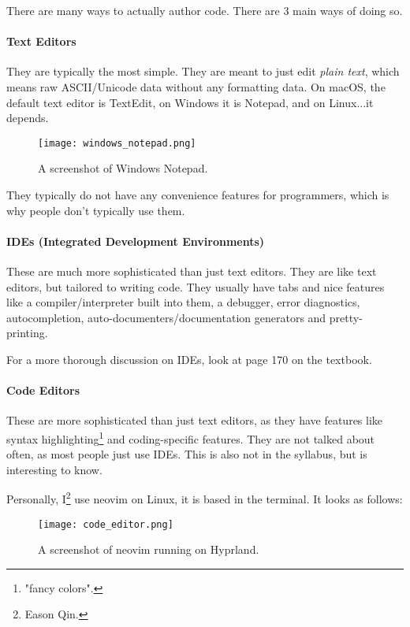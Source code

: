 \documentclass[../main.tex]{subfiles}
\begin{document}
There are many ways to actually author code. There are 3 main ways of doing so.

\paragraph{Text Editors}

They are typically the most simple. They are meant to just edit \emph{plain text}, which means raw ASCII/Unicode data without any formatting data. On macOS, the default text editor is TextEdit, on Windows it is Notepad, and on Linux...it depends.

\begin{figure}[H]
    \centering
    \texttt{[image: windows\_notepad.png]}
    \caption{A screenshot of Windows Notepad.}
    \label{fig:windows_notepad}
\end{figure}

They typically do not have any convenience features for programmers, which is why people don't typically use them.

\paragraph{IDEs (Integrated Development Environments)}

These are much more sophisticated than just text editors. They are like text editors, but tailored to writing code. They usually have tabs and nice features like a compiler/interpreter built into them, a debugger, error diagnostics, autocompletion, auto-documenters/documentation generators and pretty-printing.

For a more thorough discussion on IDEs, look at page 170 on the textbook.

\paragraph{Code Editors}

These are more sophisticated than just text editors, as they have features like syntax highlighting\footnote{"fancy colors".} and coding-specific features. They are not talked about often, as most people just use IDEs. This is also not in the syllabus, but is interesting to know.

Personally, I\footnote{Eason Qin.} use {\mono neovim} on Linux, it is based in the terminal. It looks as follows:

\begin{figure}[H]
    \centering
    \texttt{[image: code\_editor.png]}
    \caption{A screenshot of neovim running on Hyprland.}
    \label{fig:code_editor}
\end{figure}
\end{document}
